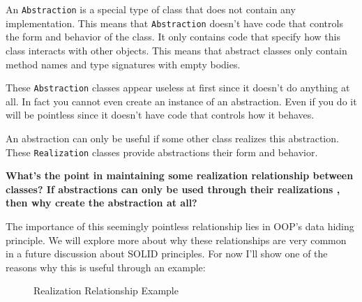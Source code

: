 An \texttt{Abstraction} is a special type of class that does not contain
any implementation. This means that \texttt{Abstraction} doesn't have
code that controls the form and behavior of the class. It only contains
code that specify how this class interacts with other objects. This
means that abstract classes only contain method names and type
signatures with empty bodies.

These \texttt{Abstraction} classes appear useless at first since it
doesn't do anything at all. In fact you cannot even create an instance
of an abstraction. Even if you do it will be pointless since it doesn't
have code that controls how it behaves.

An abstraction can only be useful if some other class realizes this
abstraction. These \texttt{Realization} classes provide abstractions
their form and behavior.

\textbf{What's the point in maintaining some realization relationship
between classes? If abstractions can only be used through their
realizations , then why create the abstraction at all?}

The importance of this seemingly pointless relationship lies in OOP's
data hiding principle. We will explore more about why these
relationships are very common in a future discussion about SOLID
principles. For now I'll show one of the reasons why this is useful
through an example:

\begin{figure}
\centering
{}
\caption{Realization Relationship Example}
\end{figure}

